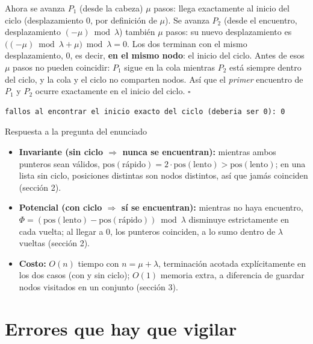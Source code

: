 \documentclass[11pt]{article}
\begin{document}
Ahora se avanza $P_1$ (desde la cabeza) $\mu$ pasos: llega exactamente al inicio del ciclo (desplazamiento 0,
por definición de $\mu$). Se avanza $P_2$ (desde el encuentro, desplazamiento $(-\mu)\bmod\lambda$) también
$\mu$ pasos: su nuevo desplazamiento es $\big((-\mu)\bmod\lambda + \mu\big)\bmod\lambda = 0$. Los dos
terminan con el mismo desplazamiento, 0, es decir, \textbf{en el mismo nodo}: el inicio del ciclo.
Antes de esos $\mu$ pasos no pueden coincidir: $P_1$ sigue en la cola mientras $P_2$ está siempre dentro del
ciclo, y la cola y el ciclo no comparten nodos. Así que el \emph{primer} encuentro de $P_1$ y $P_2$ ocurre
exactamente en el inicio del ciclo. $\square$

\begin{lstlisting}[style=salida]
fallos al encontrar el inicio exacto del ciclo (deberia ser 0): 0
\end{lstlisting}

\begin{resultado}{Respuesta a la pregunta del enunciado}
\begin{itemize}[leftmargin=14pt]
\item \textbf{Invariante (sin ciclo $\Rightarrow$ nunca se encuentran):} mientras ambos punteros sean
válidos, $\mathrm{pos}(\text{rápido})=2\cdot\mathrm{pos}(\mathrm{lento})>\mathrm{pos}(\mathrm{lento})$; en
una lista sin ciclo, posiciones distintas son nodos distintos, así que jamás coinciden (sección 2).
\item \textbf{Potencial (con ciclo $\Rightarrow$ sí se encuentran):} mientras no haya encuentro,
$\Phi=(\mathrm{pos}(\mathrm{lento})-\mathrm{pos}(\text{rápido}))\bmod\lambda$ disminuye estrictamente
en cada vuelta; al llegar a 0, los punteros coinciden, a lo sumo dentro de $\lambda$ vueltas (sección 2).
\item \textbf{Costo:} $O(n)$ tiempo con $n=\mu+\lambda$, terminación acotada explícitamente en los dos casos
(con y sin ciclo); $O(1)$ memoria extra, a diferencia de guardar nodos visitados en un conjunto (sección 3).
\end{itemize}
\end{resultado}

\section*{Errores que hay que vigilar}
\end{document}
